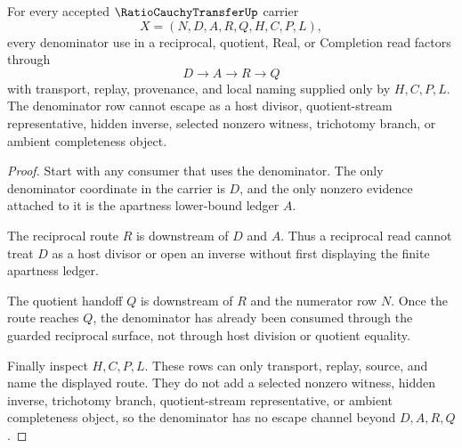 \begin{theorem}
\label{thm:ratio-cauchy-transfer-denominator-nonescape}
For every accepted $\RatioCauchyTransferUp$ carrier
$$
X=(N,D,A,R,Q,H,C,P,L),
$$
every denominator use in a reciprocal, quotient, Real, or Completion read factors through
$$
D \longrightarrow A \longrightarrow R \longrightarrow Q
$$
with transport, replay, provenance, and local naming supplied only by $H,C,P,L$. The denominator row cannot escape as a host divisor, quotient-stream representative, hidden inverse, selected nonzero witness, trichotomy branch, or ambient completeness object.
\end{theorem}
\begin{proof}
Start with any consumer that uses the denominator. The only denominator coordinate in the carrier is $D$, and the only nonzero evidence attached to it is the apartness lower-bound ledger $A$.

The reciprocal route $R$ is downstream of $D$ and $A$. Thus a reciprocal read cannot treat $D$ as a host divisor or open an inverse without first displaying the finite apartness ledger.

The quotient handoff $Q$ is downstream of $R$ and the numerator row $N$. Once the route reaches $Q$, the denominator has already been consumed through the guarded reciprocal surface, not through host division or quotient equality.

Finally inspect $H,C,P,L$. These rows can only transport, replay, source, and name the displayed route. They do not add a selected nonzero witness, hidden inverse, trichotomy branch, quotient-stream representative, or ambient completeness object, so the denominator has no escape channel beyond $D,A,R,Q$.
\end{proof}

